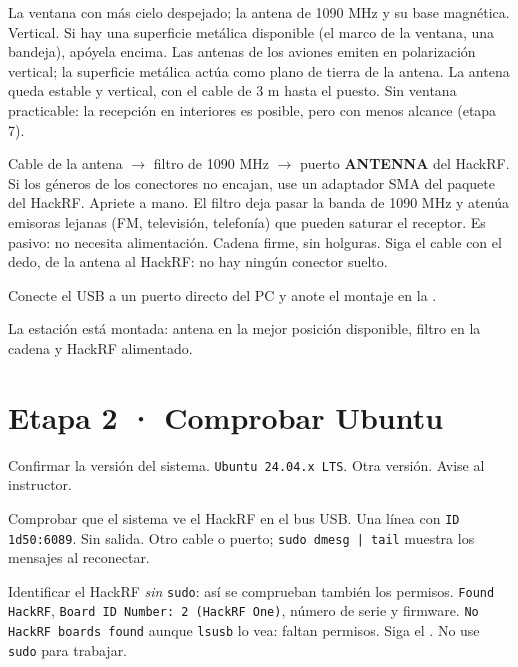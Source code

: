 {La ventana con más cielo despejado; la antena de 1090 MHz y su base magnética.}
{Vertical. Si hay una superficie metálica disponible (el marco de la ventana, una bandeja), apóyela encima.}
{Las antenas de los aviones emiten en polarización vertical; la superficie metálica actúa como plano de tierra de la antena.}
{La antena queda estable y vertical, con el cable de 3 m hasta el puesto.}
{}
{Sin ventana practicable: la recepción en interiores es posible, pero con menos alcance (etapa 7).}

{Cable de la antena $\rightarrow$ filtro de 1090 MHz $\rightarrow$ puerto \textbf{ANTENNA} del HackRF.}
{Si los géneros de los conectores no encajan, use un adaptador SMA del paquete del HackRF. Apriete a mano.}
{El filtro deja pasar la banda de 1090 MHz y atenúa emisoras lejanas (FM, televisión, telefonía) que pueden saturar el receptor. Es pasivo: no necesita alimentación.}
{Cadena firme, sin holguras.}
{Siga el cable con el dedo, de la antena al HackRF: no hay ningún conector suelto.}
{}

Conecte el USB a un puerto directo del PC y anote el montaje en la .

\begin{logro}
La estación está montada: antena en la mejor posición disponible, filtro en la cadena y HackRF alimentado.
\end{logro}

\section{Etapa 2 · Comprobar Ubuntu}
\label{sec:u-ubuntu}


{Confirmar la versión del sistema.}
{\texttt{Ubuntu 24.04.x LTS}.}
{Otra versión.}
{Avise al instructor.}

{Comprobar que el sistema ve el HackRF en el bus USB.}
{Una línea con \texttt{ID 1d50:6089}.}
{Sin salida.}
{Otro cable o puerto; \texttt{sudo dmesg | tail} muestra los mensajes al reconectar.}

{Identificar el HackRF \emph{sin} \texttt{sudo}: así se comprueban también los permisos.}
{\texttt{Found HackRF}, \texttt{Board ID Number: 2 (HackRF One)}, número de serie y firmware.}
{\texttt{No HackRF boards found} aunque \texttt{lsusb} lo vea: faltan permisos.}
{Siga el . No use \texttt{sudo} para trabajar.}


